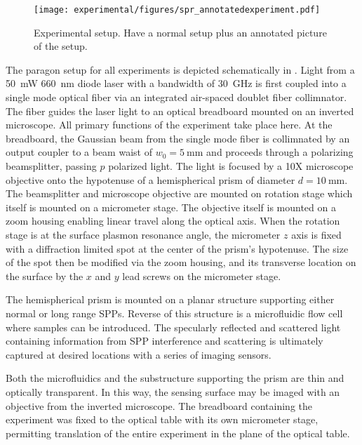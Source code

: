 \begin{figure}[ht]
 \centering
 \texttt{[image: experimental/figures/spr\_annotatedexperiment.pdf]}
 \caption{Experimental setup. Have a normal setup plus an annotated picture
 of the setup.}
 \label{fig:experimentalsetup}
\end{figure}

The paragon setup for all experiments is depicted schematically in
.  Light from a \SI{50}{\milli\watt}
\SI{660}{\nano\meter} diode laser with a bandwidth of \SI{30}{\giga\hertz}
is first coupled into a single mode optical fiber via an integrated
air-spaced doublet fiber collimnator.  The fiber guides the laser light to
an optical breadboard mounted on an inverted microscope.  All primary
functions of the experiment take place here.  At the breadboard, the
Gaussian beam from the single mode fiber is collimnated by an output
coupler to a beam waist of $w_0=\SI{5}{\milli\meter}$ and proceeds through
a polarizing beamsplitter, passing $p$ polarized light.  The light is
focused by a 10X microscope objective onto the hypotenuse of a
hemispherical prism of diameter $d=\SI{10}{\milli\meter}$.  The
beamsplitter and microscope objective are mounted on rotation stage which
itself is mounted on a micrometer stage.  The objective itself is mounted
on a zoom housing enabling linear travel along the optical axis.  When the
rotation stage is at the surface plasmon resonance angle, the micrometer
$z$ axis is fixed with a diffraction limited spot at the center of the
prism's hypotenuse.  The size of the spot then be modified via the zoom
housing, and its transverse location on the surface by the $x$ and $y$ lead
screws on the micrometer stage.  

The hemispherical prism is mounted on a planar structure supporting either
normal or long range SPPs.  Reverse of this structure is a microfluidic
flow cell where samples can be introduced.  The specularly reflected and
scattered light containing information from SPP interference and scattering
is ultimately captured at desired locations with a series of imaging
sensors.

Both the microfluidics and the substructure supporting the prism are thin and
optically transparent.  In this way, the sensing surface may be imaged with
an objective from the inverted microscope.  The breadboard containing the
experiment was fixed to the optical table with its own micrometer stage,
permitting translation of the entire experiment in the plane of the optical
table.

